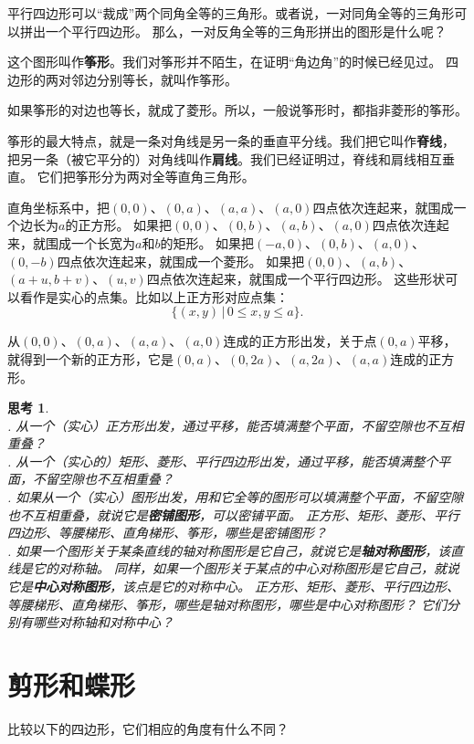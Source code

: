 \documentclass[12pt,UTF8]{ctexbook}
\newtheorem{sk}{思考}[section]
\begin{document}
平行四边形可以“裁成”两个同角全等的三角形。或者说，一对同角全等的三角形可以拼出一个平行四边形。
那么，一对反角全等的三角形拼出的图形是什么呢？

这个图形叫作\textbf{筝形}。我们对筝形并不陌生，在证明“角边角”的时候已经见过。
四边形的两对邻边分别等长，就叫作筝形。

如果筝形的对边也等长，就成了菱形。所以，一般说筝形时，都指非菱形的筝形。

筝形的最大特点，就是一条对角线是另一条的垂直平分线。我们把它叫作\textbf{脊线}，
把另一条（被它平分的）对角线叫作\textbf{肩线}。我们已经证明过，脊线和肩线相互垂直。
它们把筝形分为两对全等直角三角形。

直角坐标系中，把$(0,0)$、$(0,a)$、$(a,a)$、$(a,0)$四点依次连起来，就围成一个边长为$a$的正方形。
如果把$(0,0)$、$(0,b)$、$(a,b)$、$(a,0)$四点依次连起来，就围成一个长宽为$a$和$b$的矩形。
如果把$(-a,0)$、$(0,b)$、$(a,0)$、$(0,-b)$四点依次连起来，就围成一个菱形。
如果把$(0,0)$、$(a,b)$、$(a+u,b+v)$、$(u,v)$四点依次连起来，就围成一个平行四边形。
这些形状可以看作是实心的点集。比如以上正方形对应点集：
$$\{(x,y) \,|\, 0\leqslant x, y \leqslant a\}.$$

从$(0,0)$、$(0,a)$、$(a,a)$、$(a,0)$连成的正方形出发，关于点$(0, a)$平移，
就得到一个新的正方形，它是$(0,a)$、$(0,2a)$、$(a,2a)$、$(a,a)$连成的正方形。

\begin{sk}\label{sk:5-3-0}
    \mbox{}\\
    . 从一个（实心）正方形出发，通过平移，能否填满整个平面，不留空隙也不互相重叠？\\
    . 从一个（实心的）矩形、菱形、平行四边形出发，通过平移，能否填满整个平面，不留空隙也不互相重叠？\\    
    . 如果从一个（实心）图形出发，用和它全等的图形可以填满整个平面，不留空隙也不互相重叠，就说它是\textbf{密铺图形}，可以密铺平面。
    正方形、矩形、菱形、平行四边形、等腰梯形、直角梯形、筝形，哪些是密铺图形？\\    
    . 如果一个图形关于某条直线的轴对称图形是它自己，就说它是\textbf{轴对称图形}，该直线是它的对称轴。
    同样，如果一个图形关于某点的中心对称图形是它自己，就说它是\textbf{中心对称图形}，该点是它的对称中心。
    正方形、矩形、菱形、平行四边形、等腰梯形、直角梯形、筝形，哪些是轴对称图形，哪些是中心对称图形？
    它们分别有哪些对称轴和对称中心？
\end{sk}

\section{剪形和蝶形}
比较以下的四边形，它们相应的角度有什么不同？
\end{document}
